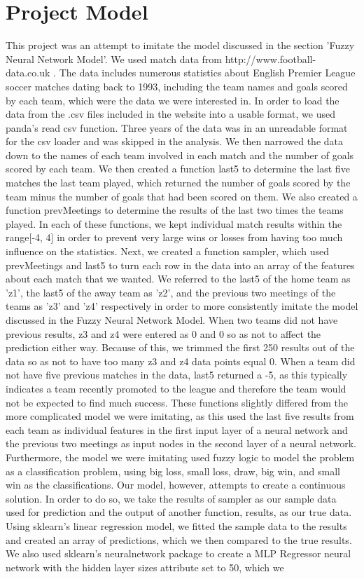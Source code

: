 \documentclass{article}
\begin{document}
\section{Project Model}
This project was an attempt to imitate the model discussed in the section 'Fuzzy Neural Network Model'. We used match data from http://www.football-data.co.uk \cite{SoccerData}. The data includes numerous statistics about English Premier League soccer matches dating back to 1993, including the team names and goals scored by each team, which were the data we were interested in. In order to load the data from the .csv files included in the website into a usable format, we used panda's read csv function. Three years of the data was in an unreadable format for the csv loader and was skipped in the analysis. We then narrowed the data down to the names of each team involved in each match and the number of goals scored by each team. We then created a function last5 to determine the last five matches the last team played, which returned the number of goals scored by the team minus the number of goals that had been scored on them. We also created a function prevMeetings to determine the results of the last two times the teams played. In each of these functions, we kept individual match results within the range[-4, 4] in order to prevent very large wins or losses from having too much influence on the statistics. Next, we created a function sampler, which used prevMeetings and last5 to turn each row in the data into an array of the features about each match that we wanted. We referred to the last5 of the home team as 'z1', the last5 of the away team as 'z2', and the previous two meetings of the teams as 'z3' and 'z4' respectively in order to more consistently imitate the model discussed in the Fuzzy Neural Network Model. When two teams did not have previous results, z3 and z4 were entered as 0 and 0 so as not to affect the prediction either way. Because of this, we trimmed the first 250 results out of the data so as not to have too many z3 and z4 data points equal 0. When a team did not have five previous matches in the data, last5 returned a -5, as this typically indicates a team recently promoted to the league and therefore the team would not be expected to find much success. These functions slightly differed from the more complicated model we were imitating, as this used the last five results from each team as individual features in the first input layer of a neural network and the previous two meetings as input nodes in the second layer of a neural network. Furthermore, the model we were imitating used fuzzy logic to model the problem as a classification problem, using big loss, small loss, draw, big win, and small win as the classifications. Our model, however, attempts to create a continuous solution. In order to do so, we take the results of sampler as our sample data used for prediction and the output of another function, results, as our true data. Using sklearn's linear regression model, we fitted the sample data to the results and created an array of predictions, which we then compared to the true results. We also used sklearn's neuralnetwork package to create a MLP Regressor neural network with the hidden layer sizes attribute set to 50, which we 
\end{document}
